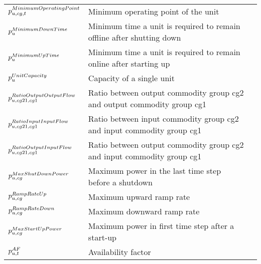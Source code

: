\begin{longtable}{p{\cola} p{\colc} >{\small\raggedleft\arraybackslash\itshape}p{\colb}}
		$p^{MinimumOperatingPoint}_{u,cg,t}$	& Minimum operating point of the unit                         	&                \\
		$p^{MinimumDownTime}_{u}$	& Minimum time a unit is required to remain offline after shutting down	&                \\
		$p^{MinimumUpTime}_{u}$	& Minimum time a unit is required to remain online after starting up	&                \\
		$p^{UnitCapacity}_{u} $	& Capacity of a single unit                                   	&                \\
		$p^{RatioOutputOutputFlow}_{u,cg21,cg1}$	& Ratio between output commodity group cg2 and output commodity group cg1	&                \\
		$p^{RatioInputInputFlow}_{u,cg21,cg1}$	& Ratio between input commodity group cg2 and input commodity group cg1	&                \\
		$p^{RatioOutputInputFlow}_{u,cg21,cg1}$	& Ratio between output commodity group cg2 and input commodity group cg1	&                \\
		$p^{MaxShutDownPower}_{u,cg}$	& Maximum power in the last time step before a shutdown       	&                \\
		$p^{RampRateUp}_{u,cg}   $	& Maximum upward ramp rate                                    	&                \\
		$p^{RampRateDown}_{u,cg} $	& Maximum downward ramp rate                                  	&                \\
		$p^{MaxStartUpPower}_{u,cg}$	& Maximum power in first time step after a start-up           	&                \\
		$p^{AF}_{u,t}           $	& Availability factor                                         	&                \\
	\end{longtable}

